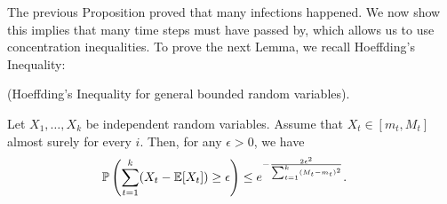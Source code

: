 The previous Proposition proved that many infections happened. We now show this implies that many time steps must have passed by, which allows us to use concentration inequalities. To prove the next Lemma, we recall Hoeffding's Inequality:
\begin{theorem}

(Hoeffding's Inequality for general bounded random variables).

 Let $X_1,\dots,X_k$ be independent random variables. Assume that $X_t \in [m_t,M_t]$ almost surely for every $i$. Then, for any $\epsilon > 0$, we have \begin{align*}
 \mathbb{P}\left(\displaystyle\sum_{t=1}^{k} (X_t - \mathbb{E}[X_t]) \geq \epsilon\right) &\leq e^{{-\frac{2\epsilon^2}{\sum_{t=1}^{k}(M_t - m_t)^2}}}.
 \end{align*}
\end{theorem}

